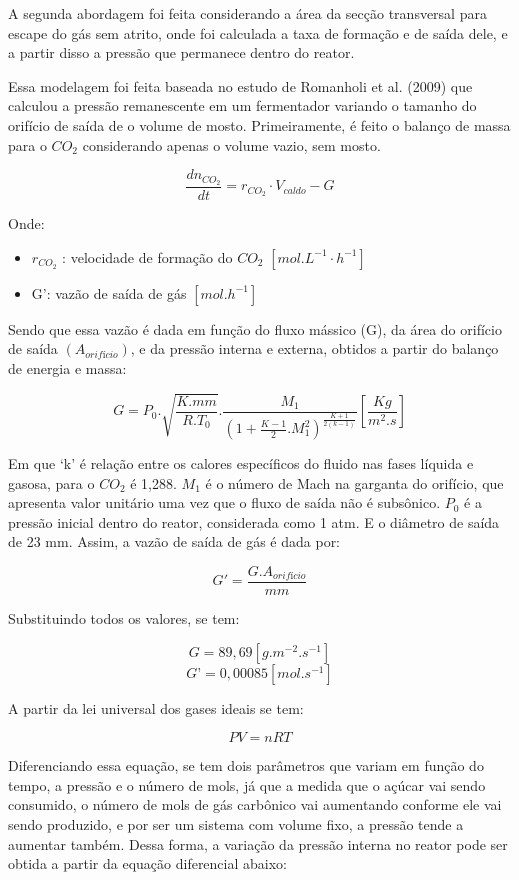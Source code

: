 A segunda abordagem foi feita considerando a área da secção transversal para escape do gás sem atrito, onde foi calculada a taxa de formação e de saída dele, e a partir disso a pressão que permanece dentro do reator.

Essa modelagem foi feita baseada no estudo de Romanholi et al. (2009)  que calculou a pressão remanescente em um fermentador variando o tamanho do orifício de saída de o volume de mosto. Primeiramente, é feito o balanço de massa para o \(CO_{2}\) considerando apenas o volume vazio, sem mosto.

\[\frac{dn_{CO_2}}{dt} = r_{CO_2}\cdot V_{caldo}-G\]

Onde:

\begin{itemize}
	\item \(r_{CO_2}\) : velocidade de formação do  \(CO_{2}\) \([mol.L^{-1} \cdot h^{-1}]\)
	\item G': vazão de saída de gás \([mol.h^{-1}]\)
\end{itemize}

Sendo que essa vazão é dada em função do fluxo mássico (G), da área do orifício de saída \((A_{orifício})\), e da pressão interna e externa, obtidos a partir do balanço de energia e massa:

\[G = P_{0}.\sqrt{\frac{K.mm}{R.T_{0}}}.\frac{M_{1}}{(1+\frac{K-1}{2}.M_1^2)^{\frac{K+1}{2(k-1)}}}[ \frac{Kg}{m^{2}.s}]\]

Em que ‘k’ é relação entre os calores específicos do fluido nas fases líquida e gasosa, para o \(CO_{2}\)  é  1,288. \(M_{1}\) é o número de Mach na garganta do orifício, que apresenta valor unitário uma vez que o fluxo de saída não é subsônico. \(P_{0}\) é a pressão inicial dentro do reator, considerada como 1 atm. E o diâmetro de saída de 23 mm. Assim, a vazão de saída de gás é dada por:

\[G'=\frac{G.A_{orifício}}{mm}\]

Substituindo todos os valores, se tem:

\[G = 89,69 [g.m^{-2}.s^{-1}]\]
\[G’ = 0,00085 [mol.s^{-1}]\]

A partir da lei universal dos gases ideais se tem:

\[PV = nRT\]

Diferenciando essa equação, se tem dois parâmetros que variam em função do tempo, a pressão e o número de mols, já que a medida que o açúcar vai sendo  consumido, o número de mols de gás carbônico vai aumentando conforme ele vai sendo produzido, e por ser um sistema com volume fixo, a pressão tende a aumentar também. Dessa forma, a variação da pressão interna no reator pode ser obtida a partir da equação diferencial abaixo:

